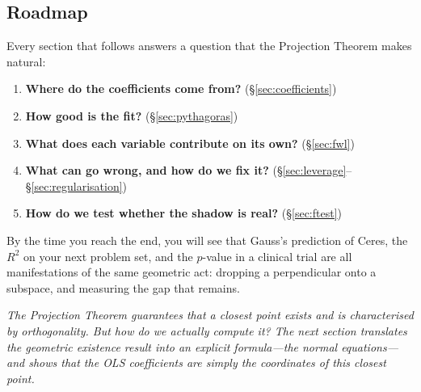 \documentclass[11pt,a4paper]{article}
\theoremstyle{plain}
\theoremstyle{definition}
\begin{document}
\subsection*{Roadmap}

Every section that follows answers a question that the Projection
Theorem makes natural:

\begin{enumerate}[leftmargin=2em]
  \item \textbf{Where do the coefficients come from?}
    (\S\ref{sec:coefficients})

  \item \textbf{How good is the fit?}
    (\S\ref{sec:pythagoras})

  \item \textbf{What does each variable contribute on its own?}
    (\S\ref{sec:fwl})

  \item \textbf{What can go wrong, and how do we fix it?}
    (\S\ref{sec:leverage}--\S\ref{sec:regularisation})

  \item \textbf{How do we test whether the shadow is real?}
    (\S\ref{sec:ftest})
\end{enumerate}

\noindent
By the time you reach the end, you will see that Gauss's prediction of
Ceres, the $R^2$ on your next problem set, and the $p$-value in a
clinical trial are all manifestations of the same geometric act:
dropping a perpendicular onto a subspace, and measuring the gap that
remains.

\medskip
\noindent\textit{The Projection Theorem guarantees that a closest point
exists and is characterised by orthogonality.
But how do we actually \emph{compute} it?
The next section translates the geometric existence result into an
explicit formula---the normal equations---and shows that the OLS
coefficients are simply the coordinates of this closest point.}
\end{document}
